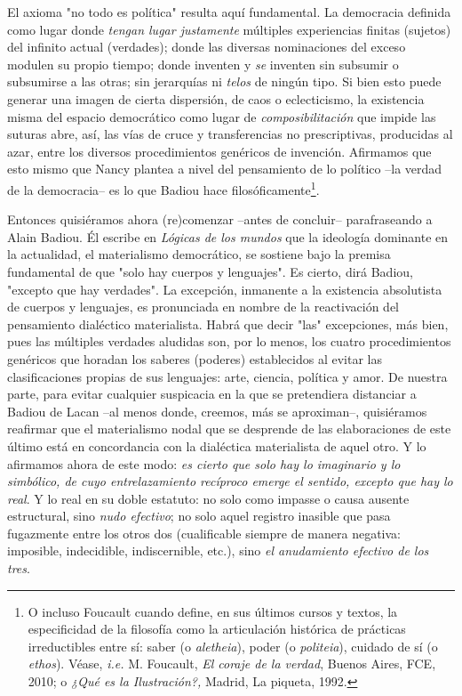 \documentclass{book}
\begin{document}
El axioma "no todo es política" resulta aquí fundamental. La democracia
definida como lugar donde \emph{tengan lugar justamente} múltiples
experiencias finitas (sujetos) del infinito actual (verdades); donde las
diversas nominaciones del exceso modulen su propio tiempo; donde
inventen y \emph{se} inventen sin subsumir o subsumirse a las otras; sin
jerarquías ni \emph{telos} de ningún tipo. Si bien esto puede generar
una imagen de cierta dispersión, de caos o eclecticismo, la existencia
misma del espacio democrático como lugar de \emph{composibilitación} que
impide las suturas abre, así, las vías de cruce y transferencias no
prescriptivas, producidas al azar, entre los diversos procedimientos
genéricos de invención. Afirmamos que esto mismo que Nancy plantea a
nivel del pensamiento de lo político --la verdad de la democracia-- es
lo que Badiou hace filosóficamente\footnote{O incluso Foucault cuando
  define, en sus últimos cursos y textos, la especificidad de la
  filosofía como la articulación histórica de prácticas irreductibles
  entre sí: saber (o \emph{aletheia}), poder (o \emph{politeia}),
  cuidado de sí (o \emph{ethos}). Véase, \emph{i.e.} M. Foucault,
  \emph{El coraje de la verdad}, Buenos Aires, FCE, 2010; o \emph{¿Qué
  es la Ilustración?,} Madrid, La piqueta, 1992.}.

Entonces quisiéramos ahora (re)comenzar --antes de concluir--
parafraseando a Alain Badiou. Él escribe en \emph{Lógicas de los mundos}
que la ideología dominante en la actualidad, el materialismo
democrático, se sostiene bajo la premisa fundamental de que "solo hay
cuerpos y lenguajes". Es cierto, dirá Badiou, "excepto que hay
verdades". La excepción, inmanente a la existencia absolutista de
cuerpos y lenguajes, es pronunciada en nombre de la reactivación del
pensamiento dialéctico materialista. Habrá que decir "las" excepciones,
más bien, pues las múltiples verdades aludidas son, por lo menos, los
cuatro procedimientos genéricos que horadan los saberes (poderes)
establecidos al evitar las clasificaciones propias de sus lenguajes:
arte, ciencia, política y amor. De nuestra parte, para evitar cualquier
suspicacia en la que se pretendiera distanciar a Badiou de Lacan --al
menos donde, creemos, más se aproximan--, quisiéramos reafirmar que el
materialismo nodal que se desprende de las elaboraciones de este último
está en concordancia con la dialéctica materialista de aquel otro. Y lo
afirmamos ahora de este modo: \emph{es cierto que solo hay lo imaginario
y lo simbólico, de cuyo entrelazamiento recíproco emerge el sentido,
excepto que hay lo real}. Y lo real en su doble estatuto: no solo como
impasse o causa ausente estructural, sino \emph{nudo efectivo}; no solo
aquel registro inasible que pasa fugazmente entre los otros dos
(cualificable siempre de manera negativa: imposible, indecidible,
indiscernible, etc.), sino \emph{el anudamiento efectivo de los tres}.
\end{document}
